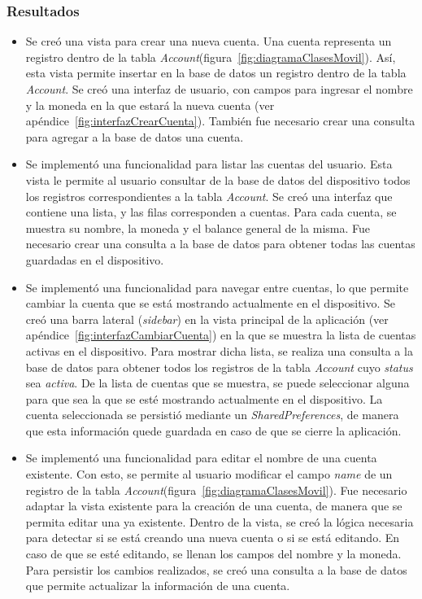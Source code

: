 \subsubsection{Resultados}
\begin{itemize}

\item Se creó una vista para crear una nueva cuenta. Una cuenta representa un registro dentro de la tabla \textit{Account}(figura~\ref{fig:diagramaClasesMovil}). Así, esta vista permite insertar en la base de datos un registro dentro de la tabla \textit{Account}. Se creó una interfaz de usuario, con campos para ingresar el nombre y la moneda en la que estará la nueva cuenta (ver apéndice~\ref{fig:interfazCrearCuenta}). También fue necesario crear una consulta para agregar a la base de datos una cuenta.
\item Se implementó una funcionalidad para listar las cuentas del usuario. Esta vista le permite al usuario consultar de la base de datos del dispositivo todos los registros correspondientes a la tabla \textit{Account}. Se creó una interfaz que contiene una lista, y las filas corresponden a cuentas. Para cada cuenta, se muestra su nombre, la moneda y el balance general de la misma. Fue necesario crear una consulta a la base de datos para obtener todas las cuentas guardadas en el dispositivo.
\item Se implementó una funcionalidad para navegar entre cuentas, lo que permite cambiar la cuenta que se está mostrando actualmente en el dispositivo. Se creó una barra lateral (\textit{sidebar}) en la vista principal de la aplicación (ver apéndice~\ref{fig:interfazCambiarCuenta}) en la que se muestra la lista de cuentas activas en el dispositivo. Para mostrar dicha lista, se realiza una consulta a la base de datos para obtener todos los registros de la tabla \textit{Account} cuyo \textit{status} sea \textit{activa}. De la lista de cuentas que se muestra, se puede seleccionar alguna para que sea la que se esté mostrando actualmente en el dispositivo. La cuenta seleccionada se persistió mediante un \textit{SharedPreferences}, de manera que esta información quede guardada en caso de que se cierre la aplicación.
\item Se implementó una funcionalidad para editar el nombre de una cuenta existente. Con esto, se permite al usuario modificar el campo \textit{name} de un registro de la tabla \textit{Account}(figura~\ref{fig:diagramaClasesMovil}). Fue necesario adaptar la vista existente para la creación de una cuenta, de manera que se permita editar una ya existente. Dentro de la vista, se creó la lógica necesaria para detectar si se está creando una nueva cuenta o si se está editando. En caso de que se esté editando, se llenan los campos del nombre y la moneda. Para persistir los cambios realizados, se creó una consulta a la base de datos que permite actualizar la información de una cuenta. 

\end{itemize}
